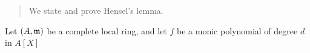 \documentclass{ximera}
\author{Bart Snapp}
\begin{document}
\begin{abstract}
  We state and prove Hensel's lemma.
\end{abstract}
\maketitle

\begin{theorem}
  Let $(A,\mathfrak{m})$ be a complete local ring, and let $f$ be a monic
  polynomial of degree $d$ in $A[X]$
\end{theorem}
\end{document}
